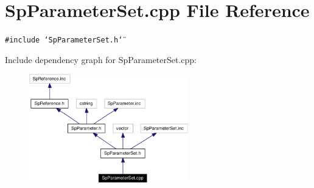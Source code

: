 \section{Sp\-Parameter\-Set.cpp File Reference}
\label{SpParameterSet_8cpp}
{\tt \#include \char`\"{}Sp\-Parameter\-Set.h\char`\"{}}\par


Include dependency graph for Sp\-Parameter\-Set.cpp:\begin{figure}[H]
\begin{center}
\leavevmode
\includegraphics[width=196pt]{SpParameterSet_8cpp__incl}
\end{center}
\end{figure}
